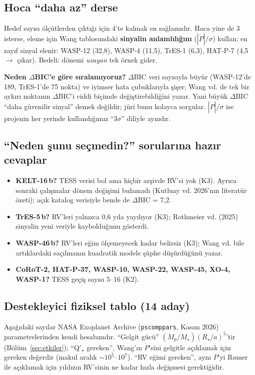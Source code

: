 \subsection{Hoca “daha az” derse}
Hedef sayısı ölçütlerden çıktığı için 4'te kalmak en sağlamıdır. Hoca yine de 3 isterse, eleme için Wang tablosundaki
\textbf{sinyalin anlamlılığını} ($|\dot P|/\sigma$) kullan; en zayıf sinyal elenir:
WASP-12 (32,8), WASP-4 (11,5), TrES-1 (6,3), HAT-P-7 (4,5 $\rightarrow$ çıkar). Bedeli: dönemi \emph{uzayan} tek örnek gider.

\textbf{Neden $\Delta$BIC'e göre sıralamıyoruz?} $\Delta$BIC veri sayısıyla büyür (WASP-12'de 189, TrES-1'de 75 nokta) ve
iyimser hata çubuklarıyla şişer; Wang vd. de tek bir aykırı noktanın $\Delta$BIC'i ciddi biçimde değiştirebildiğini
yazar. Yani büyük $\Delta$BIC “daha güvenilir sinyal” demek değildir; jüri bunu kolayca sorgular. $|\dot P|/\sigma$ ise
projenin her yerinde kullandığımız “3$\sigma$” diliyle aynıdır.

\subsection{“Neden şunu seçmedin?” sorularına hazır cevaplar}
\begin{itemize}[leftmargin=*]
\item \textbf{KELT-16\,b?} TESS verisi bol ama hiçbir arşivde RV'si yok (K3). Ayrıca sonraki çalışmalar dönem değişimi bulamadı
      (Kutluay vd. 2026'nın literatür özeti); açık katalog verisiyle bende de $\Delta$BIC = 7,2.
\item \textbf{TrES-5\,b?} RV'leri yalnızca 0,6 yıla yayılıyor (K3); Rothmeier vd. (2025) sinyalin yeni veriyle kaybolduğunu gösterdi.
\item \textbf{WASP-46\,b?} RV'leri eğim ölçemeyecek kadar belirsiz (K3); Wang vd. bile artıklardaki saçılmanın kuadratik modele
      şüphe düşürdüğünü yazar.
\item \textbf{CoRoT-2, HAT-P-37, WASP-10, WASP-22, WASP-45, XO-4, WASP-1?} TESS geçiş sayısı 5–16 (K2).
\end{itemize}

\subsection{Destekleyici fiziksel tablo (14 aday)}
Aşağıdaki sayılar NASA Exoplanet Archive (\texttt{pscomppars}, Kasım 2026) parametrelerinden kendi hesabımdır.
“Gelgit gücü” $(M_p/M_\star)(R_\star/a)^5$'tir (Bölüm~\ref{sec:etkiler}); “Q$'_\star$ gereken”, Wang'ın $\dot P$'sini
gelgitle açıklamak için gereken değerdir (makul aralık $\sim10^5$–$10^7$). “RV eğimi gereken”, aynı $\dot P$'yi
Rømer ile açıklamak için yıldızın RV'sinin ne kadar hızla değişmesi gerektiğidir.

